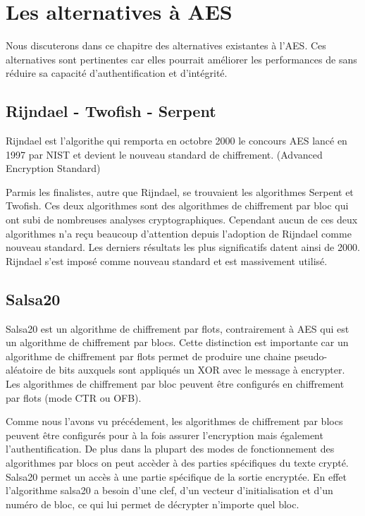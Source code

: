 
\chapter{Les alternatives à AES}
\label{anexe1}

Nous discuterons dans ce chapitre des alternatives existantes à l'AES. Ces alternatives sont pertinentes car elles pourrait améliorer les performances de \aes sans réduire sa capacité d'authentification et d'intégrité.

\section{Rijndael - Twofish - Serpent}
Rijndael est l'algorithe qui remporta en octobre 2000 le concours AES lancé en 1997 par NIST et devient le nouveau standard de chiffrement. (Advanced Encryption Standard)

Parmis les finalistes, autre que Rijndael, se trouvaient les algorithmes Serpent et Twofish. Ces deux algorithmes sont des algorithmes de chiffrement par bloc qui ont subi de nombreuses analyses cryptographiques. Cependant aucun de ces deux algorithmes n'a reçu beaucoup d'attention depuis l'adoption de Rijndael comme nouveau standard. Les derniers résultats les plus significatifs datent ainsi de 2000. Rijndael s'est imposé comme nouveau standard et est massivement utilisé.

\section{Salsa20}
Salsa20 est un algorithme de chiffrement par flots, contrairement à AES qui est un algorithme de chiffrement par blocs. Cette distinction est importante car un algorithme de chiffrement par flots permet de produire une chaine pseudo-aléatoire de bits auxquels sont appliqués un XOR avec le message à encrypter. Les algorithmes de chiffrement par bloc peuvent être configurés en chiffrement par flots (mode CTR ou OFB).

Comme nous l'avons vu précédement, les algorithmes de chiffrement par blocs peuvent être configurés pour à la fois assurer l'encryption mais également l'authentification. De plus dans la plupart des modes de fonctionnement des algorithmes par blocs on peut accèder à des parties spécifiques du texte crypté.
Salsa20 permet un accès à une partie spécifique de la sortie encryptée. En effet l'algorithme salsa20 a besoin d'une clef, d'un vecteur d'initialisation et d'un numéro de bloc, ce qui lui permet de décrypter n'importe quel bloc.

